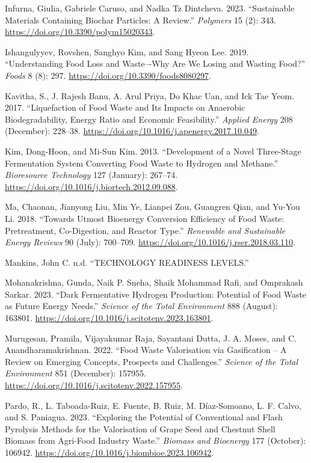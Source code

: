 \documentclass[11pt]{report}
\begin{document}
\begin{hangparas}{1.5em}{1}
\hypertarget{citeproc_bib_item_9}{Infurna, Giulia, Gabriele Caruso, and Nadka Tz Dintcheva. 2023. “Sustainable Materials Containing Biochar Particles: A Review.” \textit{Polymers} 15 (2): 343. \url{https://doi.org/10.3390/polym15020343}.}

\hypertarget{citeproc_bib_item_10}{Ishangulyyev, Rovshen, Sanghyo Kim, and Sang Hyeon Lee. 2019. “Understanding Food Loss and Waste–-Why Are We Losing and Wasting Food?” \textit{Foods} 8 (8): 297. \url{https://doi.org/10.3390/foods8080297}.}

\hypertarget{citeproc_bib_item_11}{Kavitha, S., J. Rajesh Banu, A. Arul Priya, Do Khac Uan, and Ick Tae Yeom. 2017. “Liquefaction of Food Waste and Its Impacts on Anaerobic Biodegradability, Energy Ratio and Economic Feasibility.” \textit{Applied Energy} 208 (December): 228–38. \url{https://doi.org/10.1016/j.apenergy.2017.10.049}.}

\hypertarget{citeproc_bib_item_12}{Kim, Dong-Hoon, and Mi-Sun Kim. 2013. “Development of a Novel Three-Stage Fermentation System Converting Food Waste to Hydrogen and Methane.” \textit{Bioresource Technology} 127 (January): 267–74. \url{https://doi.org/10.1016/j.biortech.2012.09.088}.}

\hypertarget{citeproc_bib_item_13}{Ma, Chaonan, Jianyong Liu, Min Ye, Lianpei Zou, Guangren Qian, and Yu-You Li. 2018. “Towards Utmost Bioenergy Conversion Efficiency of Food Waste: Pretreatment, Co-Digestion, and Reactor Type.” \textit{Renewable and Sustainable Energy Reviews} 90 (July): 700–709. \url{https://doi.org/10.1016/j.rser.2018.03.110}.}

\hypertarget{citeproc_bib_item_14}{Mankins, John C. n.d. “TECHNOLOGY READINESS LEVELS.”}

\hypertarget{citeproc_bib_item_15}{Mohanakrishna, Gunda, Naik P. Sneha, Shaik Mohammad Rafi, and Omprakash Sarkar. 2023. “Dark Fermentative Hydrogen Production: Potential of Food Waste as Future Energy Needs.” \textit{Science of the Total Environment} 888 (August): 163801. \url{https://doi.org/10.1016/j.scitotenv.2023.163801}.}

\hypertarget{citeproc_bib_item_16}{Murugesan, Pramila, Vijayakumar Raja, Sayantani Dutta, J. A. Moses, and C. Anandharamakrishnan. 2022. “Food Waste Valorisation via Gasification – A Review on Emerging Concepts, Prospects and Challenges.” \textit{Science of the Total Environment} 851 (December): 157955. \url{https://doi.org/10.1016/j.scitotenv.2022.157955}.}

\hypertarget{citeproc_bib_item_17}{Pardo, R., L. Taboada-Ruiz, E. Fuente, B. Ruiz, M. Díaz-Somoano, L. F. Calvo, and S. Paniagua. 2023. “Exploring the Potential of Conventional and Flash Pyrolysis Methods for the Valorisation of Grape Seed and Chestnut Shell Biomass from Agri-Food Industry Waste.” \textit{Biomass and Bioenergy} 177 (October): 106942. \url{https://doi.org/10.1016/j.biombioe.2023.106942}.}


\end{hangparas}
\end{document}
